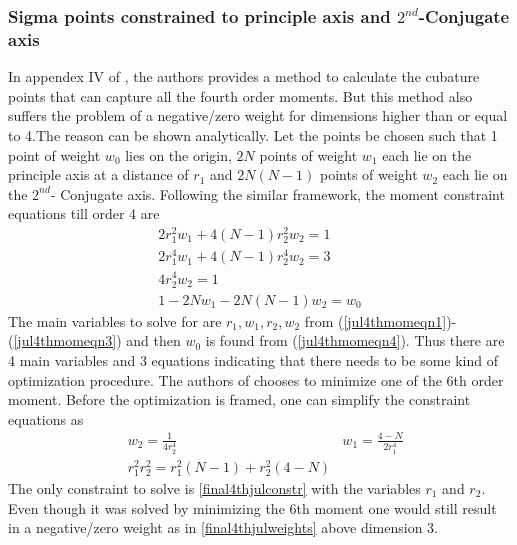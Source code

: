 \documentclass[letterpaper, 10 pt, conference]{ieeeconf}  %
\begin{document}
\subsubsection{Sigma points constrained to principle axis and $2^{nd}$-Conjugate axis}
In appendex IV of \cite{c10}, the authors provides a method to calculate the cubature points that can capture all the fourth order moments. But this method also suffers the problem of a negative/zero weight for dimensions higher than or equal to 4.The reason can be shown analytically. Let the points be chosen such that 1 point of weight $w_0$ lies on the origin, $2N$ points of weight $w_1$ each lie on the principle axis at a distance of $r_1$  and $2N(N-1)$ points of weight $w_2$ each lie on the $2^{nd}$- Conjugate axis. Following the similar framework, the moment constraint equations till order 4 are
\setlength{\arraycolsep}{0.0em}
\begin{eqnarray}
2r_1^2w_1+4(N-1)r_2^2w_2=1 \label{jul4thmomeqn1}\\
2r_1^4w_1+4(N-1)r_2^4w_2=3\label{jul4thmomeqn2}\\
4r_2^4w_2=1\label{jul4thmomeqn3}\\
1-2Nw_1-2N(N-1)w_2=w_0\label{jul4thmomeqn4}
\end{eqnarray}
\setlength{\arraycolsep}{5pt}  
The main variables to solve for are $r_1,w_1,r_2,w_2$ from (\ref{jul4thmomeqn1})-(\ref{jul4thmomeqn3}) and then $w_0$ is found from (\ref{jul4thmomeqn4}). Thus there are 4 main variables and 3 equations indicating that there needs to be some kind of optimization procedure. The authors of \cite{c1} chooses to minimize one of the 6th order moment. Before the optimization is framed, one can simplify the constraint equations as
\setlength{\arraycolsep}{0.0em}
\begin{eqnarray}
&w_2=\frac{1}{4r_2^4} \quad &w_1=\frac{4-N}{2r_1^4} \label{final4thjulweights}\\
&r_1^2r_2^2=r_1^2(N-1)+r_2^2(4-N) \label{final4thjulconstr}
\end{eqnarray}
\setlength{\arraycolsep}{5pt}    
The only constraint to solve is \ref{final4thjulconstr} with the variables $r_1$ and $r_2$. Even though it was solved by minimizing the 6th moment one would still result in a negative/zero weight as in \ref{final4thjulweights} above dimension 3.  
\end{document}
